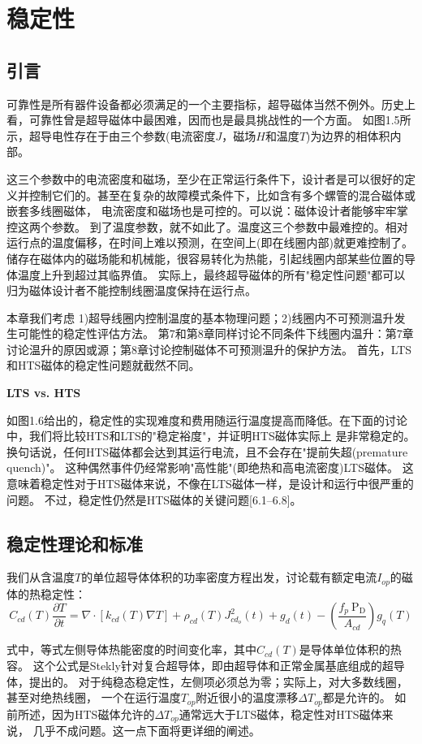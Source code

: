 \chapter{稳定性}
\section{引言}
可靠性是所有器件设备都必须满足的一个主要指标，超导磁体当然不例外。历史上看，可靠性曾是超导磁体中最困难，因而也是最具挑战性的一个方面。
如图1.5所示，超导电性存在于由三个参数(电流密度$J$，磁场$H$和温度$T$)为边界的相体积内部。

这三个参数中的电流密度和磁场，至少在正常运行条件下，设计者是可以很好的定义并控制它们的。甚至在复杂的故障模式条件下，比如含有多个螺管的混合磁体或嵌套多线圈磁体，
电流密度和磁场也是可控的。可以说：磁体设计者能够牢牢掌控这两个参数。
到了温度参数，就不如此了。温度这三个参数中最难控的。相对运行点的温度偏移，在时间上难以预测，在空间上(即在线圈内部)就更难控制了。
储存在磁体内的磁场能和机械能，很容易转化为热能，引起线圈内部某些位置的导体温度上升到超过其临界值。
实际上，最终超导磁体的所有"稳定性问题"都可以归为磁体设计者不能控制线圈温度保持在运行点。

本章我们考虑 1)超导线圈内控制温度的基本物理问题；2)线圈内不可预测温升发生可能性的稳定性评估方法。
第7和第8章同样讨论不同条件下线圈内温升：第7章讨论温升的原因或源；第8章讨论控制磁体不可预测温升的保护方法。
首先，LTS和HTS磁体的稳定性问题就截然不同。

\textbf{LTS vs. HTS}

如图1.6给出的，稳定性的实现难度和费用随运行温度提高而降低。在下面的讨论中，我们将比较HTS和LTS的"稳定裕度"，并证明HTS磁体实际上
是非常稳定的。换句话说，任何HTS磁体都会达到其运行电流，且不会存在"提前失超(premature quench)"。
这种偶然事件仍经常影响"高性能"(即绝热和高电流密度)LTS磁体。
这意味着稳定性对于HTS磁体来说，不像在LTS磁体一样，是设计和运行中很严重的问题。
不过，稳定性仍然是HTS磁体的关键问题[6.1–6.8]。

\section{稳定性理论和标准}
我们从含温度$T$的单位超导体体积的功率密度方程出发，讨论载有额定电流$I_{op}$的磁体的热稳定性：
\begin{equation}
C_{cd}(T)\frac{\partial T}{\partial t}=\nabla ·[k_{cd}(T)\nabla T]+\rho_{cd}(T)J_{cd_o}^2(t)+g_d(t)-(\frac{f_p\ \mathrm{P_D}}{A_{cd}})g_q(T)
\end{equation}

式中，等式左侧导体热能密度的时间变化率，其中$C_{cd}(T)$是导体单位体积的热容。
这个公式是Stekly针对复合超导体，即由超导体和正常金属基底组成的超导体，提出的。
对于纯稳态稳定性，左侧项必须总为零；实际上，对大多数线圈，甚至对绝热线圈，
一个在运行温度$T_{op}$附近很小的温度漂移$\Delta T_{op}$都是允许的。
如前所述，因为HTS磁体允许的$\Delta T_{op}$通常远大于LTS磁体，稳定性对HTS磁体来说，
几乎不成问题。这一点下面将更详细的阐述。

